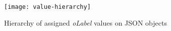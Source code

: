  
 	\begin{figure} 
 		\centering
 		\texttt{[image: value-hierarchy]}
 		\caption{Hierarchy of assigned  \textit{oLabel} values on JSON objects}
 		\label{fig:value-hierarchy}
 	\end{figure}
 